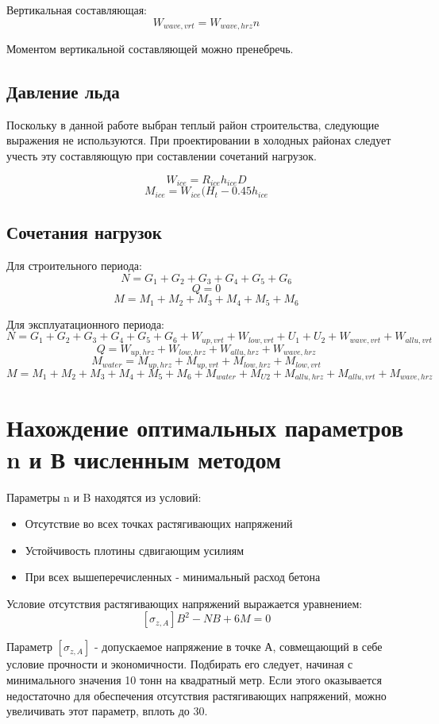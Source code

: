 \documentclass[12pt,a4paper,oneside,draft,titlepage]{article}
\begin{document}
Вертикальная составляющая:
$$ W_{wave,vrt} = W_{wave,hrz}  n $$

Моментом вертикальной составляющей можно пренебречь.

\subsection{Давление льда}

Поскольку в данной работе выбран теплый район строительства, следующие выражения не используются. При проектировании в холодных районах следует учесть эту составляющую при составлении сочетаний нагрузок.

$$ W_{ice} = R_{ice} h_{ice} D $$
$$ M_{ice} = W_{ice} (H_t - 0.45 h_{ice} $$

\subsection{Сочетания нагрузок}

Для строительного периода:
$$ N = G_1 + G_2 + G_3 + G_4 + G_5 + G_6 $$
$$ Q = 0 $$
$$ M = M_1 + M_2 + M_3 + M_4 + M_5 + M_6 $$

Для эксплуатационного периода:
$$ N = G_1 + G_2 + G_3 + G_4 + G_5 + G_6 + W_{up,vrt} + W_{low,vrt} + U_1 + U_2 + W_{wave,vrt} + W_{allu,vrt} $$
$$ Q = W_{up,hrz} + W_{low,hrz} + W_{allu,hrz} + W_{wave,hrz} $$
$$ M_{water} = M_{up,hrz} + M_{up,vrt} + M_{low,hrz} + M_{low,vrt} $$
$$ M = M_1 + M_2 + M_3 + M_4 + M_5 + M_6 + M_{water} + M_{U2} + M_{allu,hrz} + M_{allu,vrt} + M_{wave,hrz} $$

\section{Нахождение оптимальных параметров n и В численным методом}

Параметры n и B находятся из условий:
\begin{itemize}
	\item Отсутствие во всех точках растягивающих напряжений
	\item Устойчивость плотины сдвигающим усилиям
	\item При всех вышеперечисленных - минимальный расход бетона
\end{itemize}

Условие отсутствия растягивающих напряжений выражается уравнением:
$$ [\sigma_{z,A}]  B ^ 2 - N  B + 6  M = 0 $$

Параметр $[\sigma_{z,A}]$ - допускаемое напряжение в точке А, совмещающий в себе условие прочности и экономичности. Подбирать его следует, начиная с минимального значения 10 тонн на квадратный метр. Если этого оказывается недостаточно для обеспечения отсутствия растягивающих напряжений, можно увеличивать этот параметр, вплоть до 30.\newline
\end{document}
